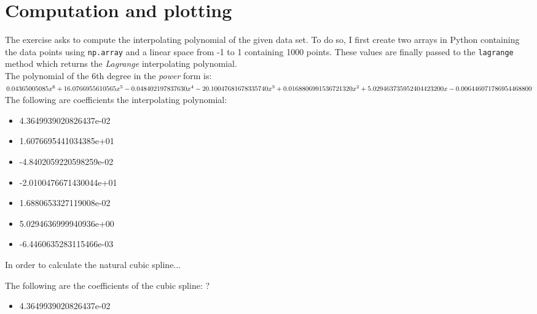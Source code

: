 \documentclass{article}
\newcommand{\code}{\texttt}
\begin{document}
\section{Computation and plotting}
The exercise asks to compute the interpolating polynomial of the given data set. To do so, I first create two arrays in Python containing the data points using \code{np.array} and a linear space from -1 to 1 containing 1000 points. These values are finally passed to the \code{lagrange} method which returns the {\it Lagrange} interpolating polynomial. \\

The polynomial of the 6th degree in the {\it power} form is: \\

$0.04365005085x^6 + 16.0766955610565x^5 - 0.048402197837630x^4 - 20.10047681678335740x^3\\ + 0.0168806991536721320x^2 + 5.029463735952404423200x - 0.006446071786954468800$ \\

The following are coefficients the interpolating polynomial:
 \begin{itemize}
  \item 4.3649939020826437e-02
  \item 1.6076695441034385e+01
  \item -4.8402059220598259e-02
  \item -2.0100476671430044e+01
  \item 1.6880653327119008e-02
  \item 5.0294636999940936e+00
  \item -6.4460635283115466e-03
  \end{itemize}

In order to calculate the natural cubic spline...

The following are the coefficients of the cubic spline: ?
 \begin{itemize}
  \item 4.3649939020826437e-02
  \end{itemize}
\end{document}
